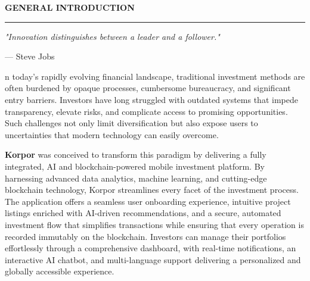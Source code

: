 \begin{center}
\color{primary}\Large\textbf{\MakeUppercase{General Introduction}}
\end{center}
\vspace{0.1cm}
\begin{center}
\rule{0.6\textwidth}{1pt}
\end{center}
\vspace{0.3cm}
\thispagestyle{empty}

\begin{flushright}
\begin{minipage}{0.7\textwidth}
\small\itshape "Innovation distinguishes between a leader and a follower."
\begin{flushright}
\normalfont --- Steve Jobs
\end{flushright}
\end{minipage}
\end{flushright}
\vspace{0.3cm}

\begingroup %
\setlength{\parindent}{0pt} %
\setlength{\parskip}{0.2em} %
\footnotesize %

n today's rapidly evolving financial landscape, traditional investment methods are often burdened by opaque processes, cumbersome bureaucracy, and significant entry barriers. Investors have long struggled with outdated systems that impede transparency, elevate risks, and complicate access to promising opportunities. Such challenges not only limit diversification but also expose users to uncertainties that modern technology can easily overcome.

\vspace{0.1cm}
\noindent \textbf{\textcolor{primary}{Korpor}} was conceived to transform this paradigm by delivering a fully integrated, AI and blockchain-powered mobile investment platform. By harnessing advanced data analytics, machine learning, and cutting-edge blockchain technology, Korpor streamlines every facet of the investment process. The application offers a seamless user onboarding experience, intuitive project listings enriched with AI-driven recommendations, and a secure, automated investment flow that simplifies transactions while ensuring that every operation is recorded immutably on the blockchain. Investors can manage their portfolios effortlessly through a comprehensive dashboard, with real-time notifications, an interactive AI chatbot, and multi-language support delivering a personalized and globally accessible experience.

